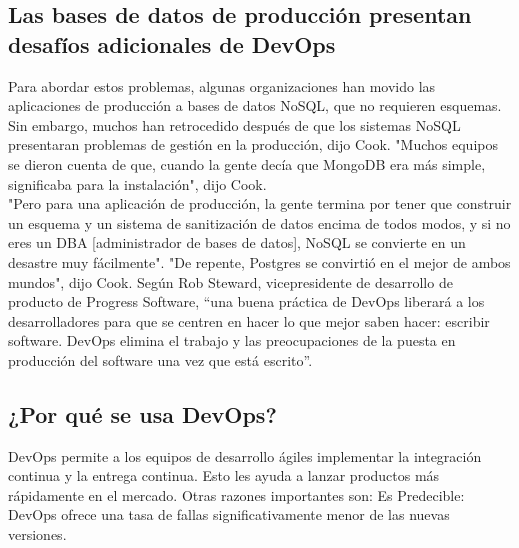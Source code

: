 \documentclass[preprint,12pt]{elsarticle}
\begin{document}
\subsection{Las bases de datos de producción presentan desafíos adicionales de DevOps}
Para abordar estos problemas, algunas organizaciones han movido las aplicaciones de producción a bases de datos NoSQL, que no requieren esquemas. 
Sin embargo, muchos han retrocedido después de que los sistemas NoSQL presentaran problemas de gestión en la producción, dijo Cook.
"Muchos equipos se dieron cuenta de que, cuando la gente decía que MongoDB era más simple, significaba para la instalación", dijo Cook.
\\
 "Pero para una aplicación de producción, la gente termina por tener que construir un esquema y un sistema de sanitización de datos encima de todos modos, y si no eres un DBA [administrador de bases de datos], NoSQL se convierte en un desastre muy fácilmente".
"De repente, Postgres se convirtió en el mejor de ambos mundos", dijo Cook.
Según Rob Steward, vicepresidente de desarrollo de producto de Progress Software, “una buena práctica de DevOps liberará a los desarrolladores para que se centren en hacer lo que mejor saben hacer: escribir software. DevOps elimina el trabajo y las preocupaciones de la puesta en producción del software una vez que está escrito”.


\subsection{¿Por qué se usa DevOps?}

DevOps permite a los equipos de desarrollo ágiles implementar la integración continua y la entrega continua. Esto les ayuda a lanzar productos más rápidamente en el mercado.
Otras razones importantes son:
Es Predecible: DevOps ofrece una tasa de fallas significativamente menor de las nuevas versiones.
\end{document}

